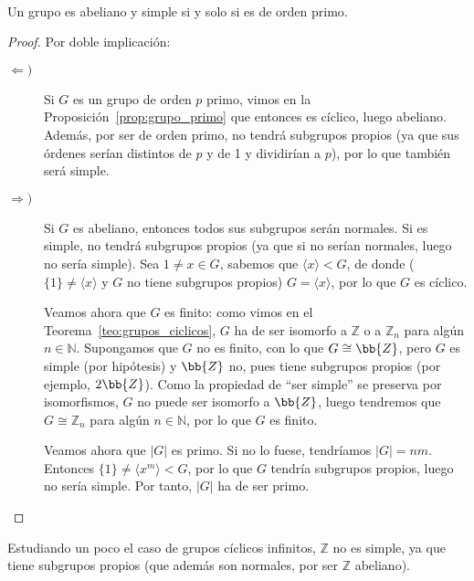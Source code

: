 \begin{prop}\ \\ \label{prop:carac_simples_abelianos}
    Un grupo es abeliano y simple si y solo si es de orden primo.
    \begin{proof}
        Por doble implicación:
        \begin{description}
            \item [$\Longleftarrow)$] Si $G$ es un grupo de orden $p$ primo, vimos en la Proposición~\ref{prop:grupo_primo} que entonces es cíclico, luego abeliano. Además, por ser de orden primo, no tendrá subgrupos propios (ya que sus órdenes serían distintos de $p$ y de 1 y dividirían a $p$), por lo que también será simple.
            \item [$\Longrightarrow)$] Si $G$ es abeliano, entonces todos sus subgrupos serán normales. Si es simple, no tendrá subgrupos propios (ya que si no serían normales, luego no sería simple). Sea $1\neq x\in G$, sabemos que $\langle x \rangle < G$, de donde ($\{1\}\neq \langle x \rangle $ y $G$ no tiene subgrupos propios) $G = \langle x \rangle $, por lo que $G$ es cíclico.
            
                Veamos ahora que $G$ es finito: como vimos en el Teorema~\ref{teo:grupos_ciclicos}, $G$ ha de ser isomorfo a $\mathbb{Z}$ o a $\mathbb{Z}_n$ para algún $n\in \mathbb{N}$. Supongamos que $G$ no es finito, con lo que $G\cong \bb{Z}$, pero $G$ es simple (por hipótesis) y $\bb{Z}$ no, pues tiene subgrupos propios (por ejemplo, $2\bb{Z}$). Como la propiedad de ``ser simple'' se preserva por isomorfismos, $G$ no puede ser isomorfo a $\bb{Z}$, luego tendremos que $G\cong \mathbb{Z}_n$ para algún $n\in \mathbb{N}$, por lo que $G$ es finito.

            Veamos ahora que $|G|$ es primo. Si no lo fuese, tendríamos $|G| = nm$. Entonces $\{1\}\neq \langle x^m \rangle < G$, por lo que $G$ tendría subgrupos propios, luego no sería simple. Por tanto, $|G|$ ha de ser primo.
        \end{description}
    \end{proof}
\end{prop}

\begin{ejemplo}
    Estudiando un poco el caso de grupos cíclicos infinitos, $\mathbb{Z}$ no es simple, ya que tiene subgrupos propios (que además son normales, por ser $\mathbb{Z}$ abeliano).
\end{ejemplo}


